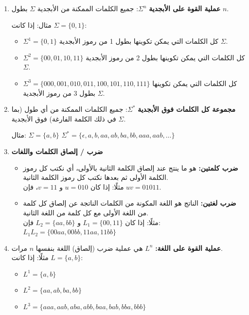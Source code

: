 \documentclass[12pt]{article}
\begin{document}
\begin{enumerate}

\item
    \textbf{عملية القوة على الأبجدية} $\Sigma^n$: جميع الكلمات الممكنة من الأبجدية $\Sigma$ بطول $n$.

    مثال: إذا كانت $\Sigma = \{0,1\}$:
    \begin{itemize}
        \item $\Sigma^1 = \{0, 1\}$ كل الكلمات التي يمكن تكوينها بطول 1 من رموز الأبجدية $\Sigma$.
        \item $\Sigma^2 = \{00, 01, 10, 11\}$ كل الكلمات التي يمكن تكوينها بطول 2 من رموز الأبجدية $\Sigma$.
        \item $\Sigma^3 = \{000, 001, 010, 011, 100, 101, 110, 111\}$ كل الكلمات التي يمكن تكوينها بطول 3 من رموز الأبجدية $\Sigma$.
    \end{itemize}

\item
    \textbf{مجموعة كل الكلمات فوق الأبجدية} $\Sigma^*$: جميع الكلمات الممكنة من أي طول (بما في ذلك الكلمة الفارغة) فوق الأبجدية $\Sigma$.

    مثال: $\Sigma = \{a, b\}$
    $\Sigma^* = \{\epsilon, a, b, aa, ab, ba, bb, aaa, aab, \dots\}$

\item
    \textbf{ضرب / إلصاق الكلمات واللغات}
    \begin{itemize}
        \item \textbf{ضرب كلمتين:} هو ما ينتج عند إلصاق الكلمة الثانية بالأولى، أي نكتب كل رموز الكلمة الأولى ثم بعدها نكتب كل رموز الكلمة الثانية. \\
        مثلًا: إذا كان $u = 010$ و $v = 11$، فإن $uv = 01011$.
        \item \textbf{ضرب لغتين:} الناتج هو اللغة المكونة من الكلمات الناتجة عن إلصاق كل كلمة من اللغة الأولى مع كل كلمة من اللغة الثانية. \\
        مثلًا: إذا كان $L_1 = \{00,11\}$ و $L_2 = \{aa,bb\}$ فإن: $L_1L_2 = \{00aa, 00bb, 11aa, 11bb\}$
    \end{itemize}

\item
    \textbf{عملية القوة على اللغة:} $L^n$ هي عملية ضرب (إلصاق) اللغة بنفسها $n$ مرات. \\
    مثلًا: إذا كانت $L = \{a,b\}$:
    \begin{itemize}
        \item $L^1 = \{a,b\}$
        \item $L^2 = \{aa, ab, ba, bb\}$
        \item $L^3 = \{aaa, aab, aba, abb, baa, bab, bba, bbb\}$
    \end{itemize}


\end{enumerate}
\end{document}
